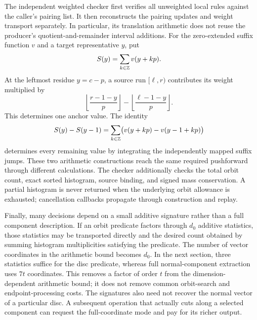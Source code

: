 The independent weighted checker first verifies all unweighted local rules
against the caller's pairing list. It then reconstructs the pairing updates
and weight transport separately. In particular, its translation arithmetic
does not reuse the producer's quotient-and-remainder interval additions.
For the zero-extended suffix function $v$ and a target representative $y$, put
\[
 S(y)=\sum_{k\in\mathbb Z}v(y+kp).
\]
At the leftmost residue $y=c-p$, a source run $[\ell,r)$ contributes its
weight multiplied by
\[
 \left\lfloor\frac{r-1-y}{p}\right\rfloor
 -\left\lfloor\frac{\ell-1-y}{p}\right\rfloor.
\]
This determines one anchor value. The identity
\[
 S(y)-S(y-1)=\sum_{k\in\mathbb Z}\bigl(v(y+kp)-v(y-1+kp)\bigr)
\]
determines every remaining value by integrating the independently mapped
suffix jumps. These two arithmetic constructions reach the same required
pushforward through different calculations. The checker additionally checks
the total orbit count, exact sorted histogram, source binding, and signed
mass conservation. A partial histogram is never returned when the
underlying orbit allowance is exhausted; cancellation callbacks propagate
through construction and replay.

Finally, many decisions depend on a small additive signature rather than a
full component description. If an orbit predicate factors through $d_0$
additive statistics, those statistics may be transported directly and the
desired count obtained by summing histogram multiplicities satisfying the
predicate. The number of vector coordinates in the arithmetic bound becomes
$d_0$. In the next section, three statistics suffice for the disc predicate,
whereas full normal-component extraction uses $7t$ coordinates. This removes
a factor of order $t$ from the dimension-dependent arithmetic bound; it does
not remove common orbit-search and endpoint-processing costs. The signatures
also need not recover the normal vector of a particular disc. A subsequent
operation that actually cuts along a selected component can request the
full-coordinate mode and pay for its richer output.
